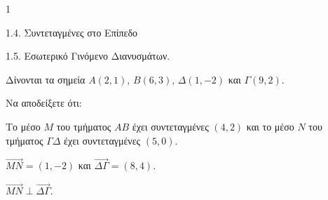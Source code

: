 \begin{ylh}{1}
    \item 1.4. Συντεταγμένες στο Επίπεδο
    \item 1.5. Εσωτερικό Γινόμενο Διανυσμάτων.
\end{ylh}
Δίνονται τα σημεία $A(2,1)$, $B(6,3)$, $\Delta(1,-2)$ και $\Gamma(9,2)$.

Να αποδείξετε ότι:
\begin{alist}
\item Το μέσο $M$ του τμήματος $AB$ έχει συντεταγμένες $(4,2)$ και το μέσο $N$ του τμήματος $\Gamma\Delta$ έχει συντεταγμένες $(5,0)$. 
\item $\overrightarrow{MN} = (1,-2)$ και $\overrightarrow{\Delta\Gamma} = (8,4)$. 
\item $\overrightarrow{MN} \perp \overrightarrow{\Delta\Gamma}$. 
\end{alist}